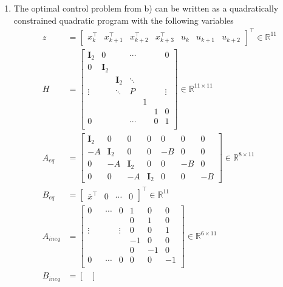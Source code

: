 \documentclass[12pt,pdftex,a4paper]{scrartcl}
\newcommand{\set}[1]{\mathbb{#1}}
\newcommand{\mat}[1]{\textbf{#1}}
\begin{document}
\begin{enumerate}
   \item The optimal control problem from b) can be written as a quadratically constrained quadratic program with the following variables
   \begin{align*}
		z &=
		\begin{bmatrix}
			x_k^\top & x_{k+1}^\top & x_{k+2}^\top & x_{k+3}^\top & u_k &  u_{k+1} & u_{k+2} 
		\end{bmatrix}^\top
		\in \set{R}^{11} \\
		H &=
		\begin{bmatrix}
			\mat{I}_{2} & 0 & & \cdots&  & & 0 \\
			0 & \mat{I}_{2} & & & & & \\
			&  & \mat{I}_{2} & \ddots & & & \\
			\vdots & & \ddots & P & & & \vdots \\
			& & & & 1 & & \\
			& & & &  & 1 & 0 \\
			0 & & & \cdots & & 0 & 1 \\
		\end{bmatrix}
		\in \set{R}^{11 \times 11} \\
		A_{eq} &= 
		\begin{bmatrix}
			\mat{I}_2 & 0 & 0 & 0 & 0 & 0 & 0 \\
			-A & \mat{I}_2 & 0 & 0 & -B & 0 & 0 \\
			0 & -A & \mat{I}_2 & 0 & 0 & -B & 0\\
			0 & 0 & -A & \mat{I}_2 & 0 & 0 & -B
		\end{bmatrix}
		\in \set{R}^{8 \times 11} \\	
		B_{eq} &= 
		\begin{bmatrix}
			\bar{x}^\top & 0 & \cdots & 0
		\end{bmatrix}^\top
		\in \set{R}^{11} \\
		A_{ineq} &=
		\begin{bmatrix}
			0 & & \cdots & 0 & 1 & 0 & 0 \\
			& & & & 0 & 1 & 0 \\
			\vdots & & & \vdots & 0 & 0 & 1 \\
			& & & & -1 & 0 & 0 \\
			& & & & 0 & -1 & 0 \\
			0 & & \cdots & 0 & 0 & 0 & -1 \\
		\end{bmatrix}
		\in \set{R}^{6 \times 11} \\
		B_{ineq} &=
		\begin{bmatrix}

\end{bmatrix}
\end{align*}
\end{enumerate}
\end{document}
